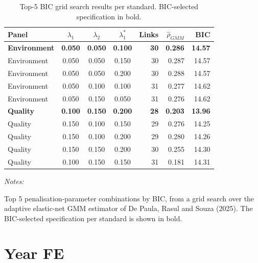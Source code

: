 \documentclass[
  letterpaper,
  DIV=11,
  numbers=noendperiod]{scrartcl}
\begin{document}
\begin{table}[!h]
\centering
\caption{\label{tab:tab:grid_search}Top-5 BIC grid search results per standard. BIC-selected specification in bold.}
\centering
\fontsize{9}{11}\selectfont
\begin{threeparttable}
\begin{tabular}[t]{lcccrrr}
\toprule
Panel & $\lambda_1$ & $\lambda_2$ & $\lambda_1^*$ & Links & $\hat\rho_{GMM}$ & BIC\\
\midrule
\textbf{Environment} & \textbf{0.050} & \textbf{0.050} & \textbf{0.100} & \textbf{30} & \textbf{0.286} & \textbf{14.57}\\
Environment & 0.050 & 0.050 & 0.150 & 30 & 0.287 & 14.57\\
Environment & 0.050 & 0.050 & 0.200 & 30 & 0.288 & 14.57\\
Environment & 0.050 & 0.100 & 0.100 & 31 & 0.277 & 14.62\\
Environment & 0.050 & 0.150 & 0.050 & 31 & 0.276 & 14.62\\
\addlinespace
\textbf{Quality} & \textbf{0.100} & \textbf{0.150} & \textbf{0.200} & \textbf{28} & \textbf{0.203} & \textbf{13.96}\\
Quality & 0.150 & 0.100 & 0.150 & 29 & 0.276 & 14.25\\
Quality & 0.150 & 0.100 & 0.200 & 29 & 0.280 & 14.26\\
Quality & 0.150 & 0.150 & 0.200 & 30 & 0.255 & 14.30\\
Quality & 0.100 & 0.150 & 0.150 & 31 & 0.181 & 14.31\\
\bottomrule
\end{tabular}
\begin{tablenotes}[para]
\item \textit{Notes:} 
\item Top 5 penalisation-parameter combinations by BIC, from a grid search over the adaptive elastic-net GMM estimator of De Paula, Rasul and Souza (2025). The BIC-selected specification per standard is shown in bold.
\end{tablenotes}
\end{threeparttable}
\end{table}

\section{Year FE}\label{year-fe}
\end{document}
